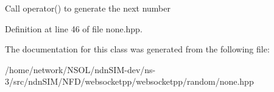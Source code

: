 Call operator() to generate the next number 

Definition at line 46 of file none.\+hpp.



The documentation for this class was generated from the following file\+:\begin{DoxyCompactItemize}
\item 
/home/network/\+N\+S\+O\+L/ndn\+S\+I\+M-\/dev/ns-\/3/src/ndn\+S\+I\+M/\+N\+F\+D/websocketpp/websocketpp/random/none.\+hpp\end{DoxyCompactItemize}

